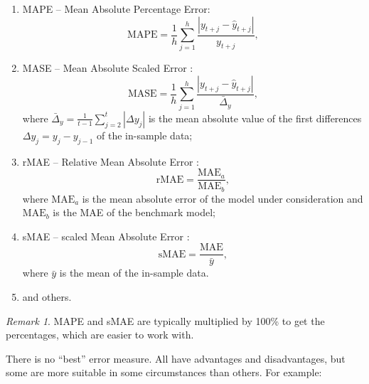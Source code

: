 \documentclass[]{book}
\providecommand{\tightlist}{%
  \setlength{\itemsep}{0pt}\setlength{\parskip}{0pt}}
\theoremstyle{definition}
\theoremstyle{definition}
\theoremstyle{definition}
\theoremstyle{definition}
\theoremstyle{remark}
\newtheorem*{remark}{Remark}
\begin{document}
\begin{enumerate}
\def\labelenumi{\arabic{enumi}.}
\tightlist
\item
  MAPE -- Mean Absolute Percentage Error:
  \begin{equation}
   \mathrm{MAPE} = \frac{1}{h} \sum_{j=1}^h \frac{|y_{t+j} -\hat{y}_{t+j}|}{y_{t+j}},
   \label{eq:MAPE}
  \end{equation}
\item
  MASE -- Mean Absolute Scaled Error \citep{Hyndman2006}:
  \begin{equation}
   \mathrm{MASE} = \frac{1}{h} \sum_{j=1}^h \frac{|y_{t+j} -\hat{y}_{t+j}|}{\bar{\Delta}_y},
   \label{eq:MASE}
  \end{equation}
  where \(\bar{\Delta}_y = \frac{1}{t-1}\sum_{j=2}^t |\Delta y_{j}|\) is the mean absolute value of the first differences \(\Delta y_{j}=y_j-y_{j-1}\) of the in-sample data;
\item
  rMAE -- Relative Mean Absolute Error \citep{Davydenko2013}:
  \begin{equation}
   \mathrm{rMAE} = \frac{\mathrm{MAE}_a}{\mathrm{MAE}_b},
   \label{eq:rMAE}
  \end{equation}
  where \(\mathrm{MAE}_a\) is the mean absolute error of the model under consideration and \(\mathrm{MAE}_b\) is the MAE of the benchmark model;
\item
  sMAE -- scaled Mean Absolute Error \citep{Petropoulos2015}:
  \begin{equation}
   \mathrm{sMAE} = \frac{\mathrm{MAE}}{\bar{y}},
   \label{eq:sMAE}
  \end{equation}
  where \(\bar{y}\) is the mean of the in-sample data.
\item
  and others.
\end{enumerate}

\begin{remark}
MAPE and sMAE are typically multiplied by 100\% to get the percentages, which are easier to work with.
\end{remark}

There is no ``best'' error measure. All have advantages and disadvantages, but some are more suitable in some circumstances than others. For example:
\end{document}

